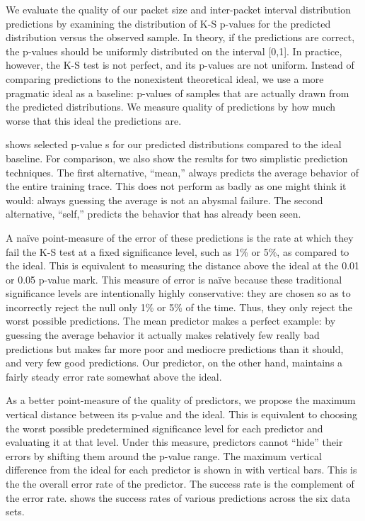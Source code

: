\documentclass[conference]{IEEEtran}
\begin{document}

We evaluate the quality of our packet size and inter-packet interval distribution predictions by examining the distribution of K-S p-values for the predicted distribution versus the observed sample.
In theory, if the predictions are correct, the p-values should be uniformly distributed on the interval [0,1].
In practice, however, the K-S test is not perfect, and its p-values are not uniform.
Instead of comparing predictions to the nonexistent theoretical ideal, we use a more pragmatic ideal as a baseline:
p-values of samples that are actually drawn from the predicted distributions.
We measure quality of predictions by how much worse that this ideal the predictions are.\ksidealnote

 shows selected p-value s for our predicted distributions compared to the ideal baseline.
For comparison, we also show the results for two simplistic prediction techniques.
The first alternative, ``mean,'' always predicts the average behavior of the entire training trace.
This does not perform as badly as one might think it would:
always guessing the average is not an abysmal failure.
The second alternative, ``self,'' predicts the behavior that has already been seen.

A na\"ive point-measure of the error of these predictions is the rate at which they fail the K-S test at a fixed significance level, such as 1\% or 5\%, as compared to the ideal.
This is equivalent to measuring the distance above the ideal  at the 0.01 or 0.05 p-value mark.
This measure of error is na\"ive because these traditional significance levels are intentionally highly conservative:
they are chosen so as to incorrectly reject the null only 1\% or 5\% of the time.
Thus, they only reject the worst possible predictions.
The mean predictor makes a perfect example:
by guessing the average behavior it actually makes relatively few really bad predictions but makes far more poor and mediocre predictions than it should, and very few good predictions.
Our predictor, on the other hand, maintains a fairly steady error rate somewhat above the ideal.

As a better point-measure of the quality of predictors, we propose the maximum vertical distance between its p-value  and the ideal.
This is equivalent to choosing the worst possible predetermined significance level for each predictor and evaluating it at that level.
Under this measure, predictors cannot ``hide'' their errors by shifting them around the p-value range.
The maximum vertical difference from the ideal for each predictor is shown in  with vertical bars.
This is the the overall error rate of the predictor.
The success rate is the complement of the error rate.
 shows the success rates of various predictions across the six data sets.
\end{document}

